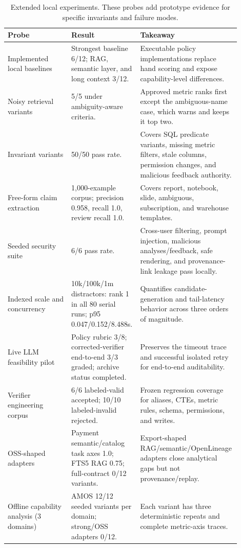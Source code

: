 \documentclass[sigconf,nonacm]{acmart}
\newcommand{\amos}{\textsc{AMOS}\xspace}
\begin{document}
\begin{table}[p]
\centering
\scriptsize
\setlength{\tabcolsep}{3pt}
\begin{tabular}{L{0.27\linewidth}L{0.21\linewidth}L{0.42\linewidth}}
\toprule
\textbf{Probe} & \textbf{Result} & \textbf{Takeaway} \\
\midrule
Implemented local baselines & Strongest baseline 6/12; RAG, semantic layer, and long context 3/12. & Executable policy implementations replace hand scoring and expose capability-level differences. \\
Noisy retrieval variants & 5/5 under ambiguity-aware criteria. & Approved metric ranks first except the ambiguous-name case, which warns and keeps it top two. \\
Invariant variants & 50/50 pass rate. & Covers SQL predicate variants, missing metric filters, stale columns, permission changes, and malicious feedback authority. \\
Free-form claim extraction & 1{,}000-example corpus; precision 0.958, recall 1.0, review recall 1.0. & Covers report, notebook, slide, ambiguous, subscription, and warehouse templates. \\
Seeded security suite & 6/6 pass rate. & Cross-user filtering, prompt injection, malicious analyses/feedback, safe rendering, and provenance-link leakage pass locally. \\
Indexed scale and concurrency & 10k/100k/1m distractors: rank 1 in all 80 serial runs; p95 0.047/0.152/8.488s. & Quantifies candidate-generation and tail-latency behavior across three orders of magnitude. \\
Live LLM feasibility pilot & Policy rubric 3/8; corrected-verifier end-to-end 3/3 graded; archive status completed. & Preserves the timeout trace and successful isolated retry for end-to-end auditability. \\
Verifier engineering corpus & 6/6 labeled-valid accepted; 10/10 labeled-invalid rejected. & Frozen regression coverage for aliases, CTEs, metric rules, schema, permissions, and writes. \\
OSS-shaped adapters & Payment semantic/catalog task axes 1.0; FTS5 RAG 0.75; full-contract 0/12 variants. & Export-shaped RAG/semantic/OpenLineage adapters close analytical gaps but not provenance/replay. \\
Offline capability analysis (3 domains) & \amos 12/12 seeded variants per domain; strong/OSS adapters 0/12. & Each variant has three deterministic repeats and complete metric-axis traces. \\
\bottomrule
\end{tabular}
\caption{Extended local experiments. These probes add prototype evidence for specific invariants and failure modes.}
\label{tab:extended-results}
\end{table}
\end{document}
